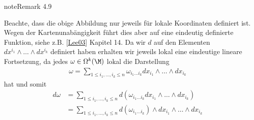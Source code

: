 \documentclass[letterpaper,10pt,german]{jupyterBook}
\begin{document}
\begin{sphinxadmonition}{note}{Remark 4.9}



\sphinxAtStartPar
Beachte, dass die obige Abbildung nur jeweils für lokale Koordinaten definiert ist. Wegen der Kartenunabängigkeit führt dies aber auf eine eindeutig definierte Funktion, siehe z.B. {[}\hyperlink{cite.references:id18}{Lee03}{]} Kapitel 14. Da wir \(d\) auf den Elementen \(dx^{i_1}\wedge\ldots\wedge dx^{i_k}\) definiert haben erhalten wir jeweils lokal eine eindeutige lineare Fortsetzung, da jedes \(\omega\in \Omega^k(\M)\) lokal die Darstellung
\begin{equation*}
\begin{split}\omega = \sum_{1\leq i_1,\ldots,i_k \leq n}\omega_{i_1\ldots i_k}
dx_{i_1}\wedge\ldots\wedge dx_{i_k}\end{split}
\end{equation*}
\sphinxAtStartPar
hat und somit
\begin{equation*}
\begin{split}d\omega &= \sum_{1\leq i_1,\ldots,i_k \leq n} d(\omega_{i_1\ldots i_k}
dx_{i_1}\wedge\ldots\wedge dx_{i_k})\\ 
&= \sum_{1\leq i_1,\ldots,i_k \leq n} d(\omega_{i_1\ldots i_k})\wedge
dx_{i_1}\wedge\ldots\wedge dx_{i_k}\end{split}
\end{equation*}\end{sphinxadmonition}
\label{manifolds/diffformen:ex:10.14}
\end{document}
